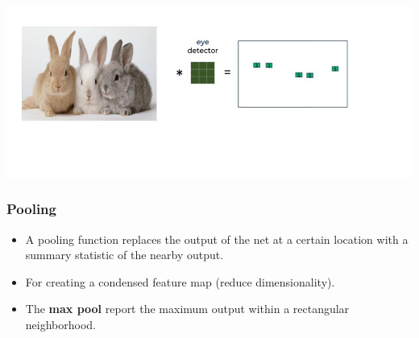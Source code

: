 \documentclass[12pt,aspectratio=169]{beamer}
\begin{document}
\begin{frame}
\begin{center}
\includegraphics[scale=0.6]{eyedetect2}
\end{center}
\end{frame}

\begin{frame}
\frametitle{Pooling}
\begin{itemize}
\item A pooling function replaces the output of the net at a certain location with a summary statistic of the nearby output.
\bigskip
\item For creating a condensed feature map (reduce dimensionality).
\bigskip
\item The \textbf{max pool} report the maximum output within a rectangular neighborhood.
\end{itemize}
\end{frame}
\end{document}
